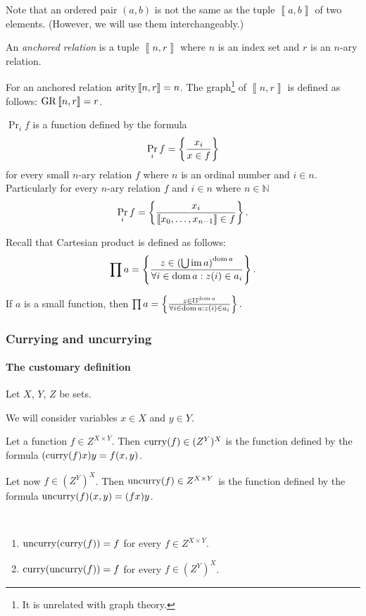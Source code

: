 Note that an ordered pair $(a,b)$ is not the same as the tuple $\left\llbracket a,b\right\rrbracket $
of two elements. (However, we will use them interchangeably.)
\begin{defn}
An \emph{anchored relation} is a tuple $\left\llbracket n,r\right\rrbracket $
where $n$ is an index set and $r$ is an $n$-ary relation.
\end{defn}
For an anchored relation $\operatorname{arity}\left\llbracket n,r\right\rrbracket =n$.
The graph\footnote{It is unrelated with graph theory.} of $\left\llbracket n,r\right\rrbracket $
is defined as follows: $\operatorname{GR}\left\llbracket n,r\right\rrbracket =r$.
\begin{defn}
$\Pr_{i}f$ is a function defined by the formula
\[
\Pr_{i}f=\left\{ \frac{x_{i}}{x\in f}\right\}
\]
for every small $n$-ary relation $f$ where $n$ is an ordinal number
and $i\in n$. Particularly for every $n$-ary relation $f$ and $i\in n$
where $n\in\mathbb{N}$
\[
\Pr_{i}f=\left\{ \frac{x_{i}}{\left\llbracket x_{0},\ldots,x_{n-1}\right\rrbracket \in f}\right\}.
\]

\end{defn}
Recall that Cartesian product is defined
as follows:
\[
\prod a=\left\{ \frac{z\in\left(\bigcup\operatorname{im} a\right)^{\operatorname{dom} a}}{\forall i\in\operatorname{dom} a:z(i)\in a_{i}}\right\}.
\]

\begin{obvious}
If $a$ is a small function, then $\prod a=\left\{ \frac{z\in\mho^{\operatorname{dom} a}}{\forall i\in\operatorname{dom} a:z(i)\in a_{i}}\right\}.$
\end{obvious}

\subsubsection{Currying and uncurrying}


\paragraph{The customary definition}

Let $X$, $Y$, $Z$ be sets.

We will consider variables $x\in X$ and $y\in Y$.

Let a function $f\in Z^{X\times Y}$. Then $\operatorname{curry}(f)\in(Z^{Y})^{X}$
is the function defined by the formula $(\operatorname{curry}(f)x)y=f(x,y)$.

Let now $f\in(Z^{Y})^{X}$. Then $\operatorname{uncurry}(f)\in Z^{X\times Y}$
is the function defined by the formula $\operatorname{uncurry}(f)(x,y)=(fx)y$.
\begin{obvious}
~
\begin{enumerate}
\item $\operatorname{uncurry}(\operatorname{curry}(f))=f$ for every $f\in Z^{X\times Y}$.
\item $\operatorname{curry}(\operatorname{uncurry}(f))=f$ for every $f\in(Z^{Y})^{X}$.
\end{enumerate}
\end{obvious}

